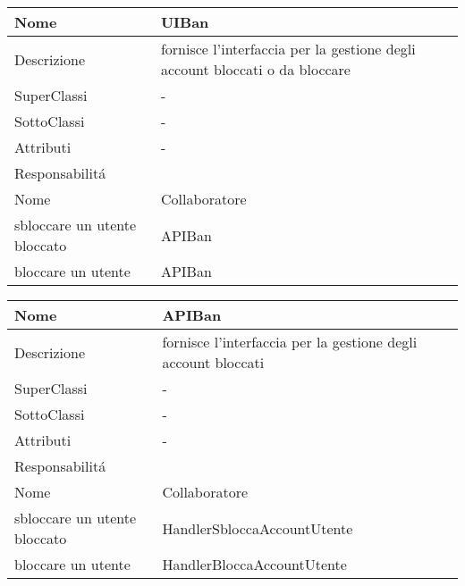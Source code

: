 
\begin{center} %
    \begin{longtable}{ |p{3cm}|p{3cm}|p{3cm}|p{3cm}| }
        \hline
        Nome & \multicolumn{3}{|p{9cm}|}{UIBan} \\\hline
        Descrizione & \multicolumn{3}{|p{9cm}|}{fornisce l'interfaccia per la gestione degli account bloccati o da bloccare} \\\hline
        SuperClassi & \multicolumn{3}{|p{9cm}|}{-} \\\hline
        SottoClassi & \multicolumn{3}{|p{9cm}|}{-} \\\hline
        Attributi & \multicolumn{3}{|p{9cm}|}{-} \\\hline
        \multicolumn{4}{|p{12cm}|}{Responsabilit\'a} \\\hline %
        \multicolumn{2}{|p{6cm}|}{Nome} & \multicolumn{2}{|p{6cm}|}{Collaboratore} \\\hline %
        \multicolumn{2}{|p{6cm}|}{sbloccare un utente bloccato} & \multicolumn{2}{|p{6cm}|}{APIBan} \\\hline        
        \multicolumn{2}{|p{6cm}|}{bloccare un utente} & \multicolumn{2}{|p{6cm}|}{APIBan} \\\hline        
    \end{longtable}
\end{center}

\begin{center} %
    \begin{longtable}{ |p{3cm}|p{3cm}|p{3cm}|p{3cm}| }
        \hline
        Nome & \multicolumn{3}{|p{9cm}|}{APIBan} \\\hline
        Descrizione & \multicolumn{3}{|p{9cm}|}{fornisce l'interfaccia per la gestione degli account bloccati} \\\hline
        SuperClassi & \multicolumn{3}{|p{9cm}|}{-} \\\hline
        SottoClassi & \multicolumn{3}{|p{9cm}|}{-} \\\hline
        Attributi & \multicolumn{3}{|p{9cm}|}{-} \\\hline
        \multicolumn{4}{|p{12cm}|}{Responsabilit\'a} \\\hline %
        \multicolumn{2}{|p{6cm}|}{Nome} & \multicolumn{2}{|p{6cm}|}{Collaboratore} \\\hline %
        \multicolumn{2}{|p{6cm}|}{sbloccare un utente bloccato} & \multicolumn{2}{|p{6cm}|}{HandlerSbloccaAccountUtente} \\\hline        
        \multicolumn{2}{|p{6cm}|}{bloccare un utente} & \multicolumn{2}{|p{6cm}|}{HandlerBloccaAccountUtente} \\\hline        
    \end{longtable}
\end{center}

